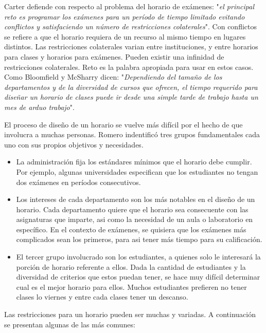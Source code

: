 Carter defiende con respecto al problema del horario de exámenes: "\emph{el principal reto es programar los
exámenes para un período de tiempo limitado evitando conflictos y satisfaciendo un número de restricciones
colaterales}". \cite{Carter's summary} Con conflictos se refiere a que el horario requiera de un recurso
al mismo tiempo en lugares distintos. Las restricciones colaterales varian entre instituciones, y entre
horarios para clases y horarios para exámenes. Pueden existir una infinidad de restricciones colaterales.
Reto es la palabra apropiada para usar en estos casos.
Como Bloomfield y McSharry dicen: "\emph{Dependiendo del tamaño de los departamentos y de la diversidad
de cursos que ofrecen, el tiempo requerido para diseñar un horario de clases puede ir desde una simple
tarde de trabajo hasta un mes de arduo trabajo}". \cite{Bloomfield and McSharry says}

El proceso de diseño de un horario se vuelve más difícil por el hecho de que involucra a muchas personas.
Romero indentificó tres grupos fundamentales cada uno con sus propios objetivos y necesidades. \cite{Romero}

\begin{itemize}
	\item La administración fija los estándares  mínimos que el horario debe cumplir. Por ejemplo, algunas
		universidades especifican que los estudiantes no tengan dos exámenes en períodos consecutivos.
	\item Los intereses de cada departamento son los más notables en el diseño de un horario. Cada departamento
		quiere que el horario sea consecuente con las asignaturas que imparte, asi como la necesidad de un
		aula o laboratorio en específico. En el contexto de exámenes, se quisiera que los exámenes más complicados
		sean los primeros, para asi tener más tiempo para su calificación.
	\item El tercer grupo involucrado son los estudiantes, a quienes solo le interesará la porción de horario
		referente a ellos. Dada la cantidad de estudiantes y la diversidad de criterios que estos puedan tener,
		se hace muy difícil determinar cual es el mejor horario para ellos. Muchos estudiantes prefieren no
		tener clases lo viernes y entre cada clases tener un descanso.		
\end{itemize}

Las restricciones para un horario pueden ser muchas y variadas. A continuación se presentan algunas de 
las más comunes:

